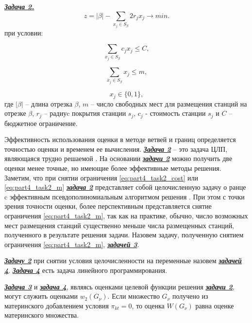 \underline{\textit{\textbf{Задача 2.}}}
\begin{displaymath}
    z = |\beta| - \sum\limits_{x_j \in S_\beta} 2r_j x_j \rightarrow min.
\end{displaymath}
при условии:

\begin{equation}\label{eq:part4_task2_cost}
    \sum\limits_{x_j \in S_\beta} c_j x_j \leqslant C,
\end{equation}

\begin{equation}\label{eq:part4_task2_m}
    \sum\limits_{x_j \in S_\beta} x_j \leqslant m,
\end{equation}

\begin{displaymath}
    x_j \in \{0, 1\},
\end{displaymath}
где $|\beta|$ -- длина отрезка $\beta$, $m$ -- число свободных мест для размещения станций на отрезке $\beta$, $r_j$ -- радиуc покрытия станции $s_j$, $c_j$ - стоимость станции $s_j$ и $C$ -- бюджетное ограничение.

Эффективность использования оценки в методе ветвей и границ определяется точностью оценки и временем ее вычисления. \underline{\textit{\textbf{Задача 2}}} -- это задача ЦЛП, являющаяся трудно решаемой \cite{Gari}. На основании \underline{\textit{\textbf{задачи 2}}} можно получить две оценки менее точные, но имеющие более эффективные методы решения. Заметим, что при снятии ограничения \cref{eq:part4_task2_cost} или \cref{eq:part4_task2_m} \underline{\textit{\textbf{задача 2}}} представляет собой целочисленную задачу о ранце c эффективным псевдополиномиальным алгоритмом решения \cite{Gari}. При этом с точки зрения точности оценки, более перспективным представляется снятие ограничения \cref{eq:part4_task2_m}, так как на практике, обычно, число возможных мест размещения станций существенно меньше числа размещенных станций, полученного в результате решения задачи. Назовем задачу, полученную снятием ограничения \cref{eq:part4_task2_m}, \underline{\textit{\textbf{задачей 3}}}.

\underline{\textit{\textbf{Задачу 2}}} при снятии условия целочисленности на переменные назовем \underline{\textit{\textbf{задачей 4}}}. \underline{\textit{\textbf{Задача 4}}} есть задача линейного программирования. 

\underline{\textit{\textbf{Задача 3}}} и \underline{\textit{\textbf{задача 4}}}, являясь оценками целевой функции решения \underline{\textit{\textbf{задачи 2}}}, могут служить оценками $w_2 (G_\nu)$. Если множество $G_\nu$ получено из материнского добавлением условия $\pi_{kt}=0$, то оценка $W(G_\nu)$ равна оценке материнского множества.

